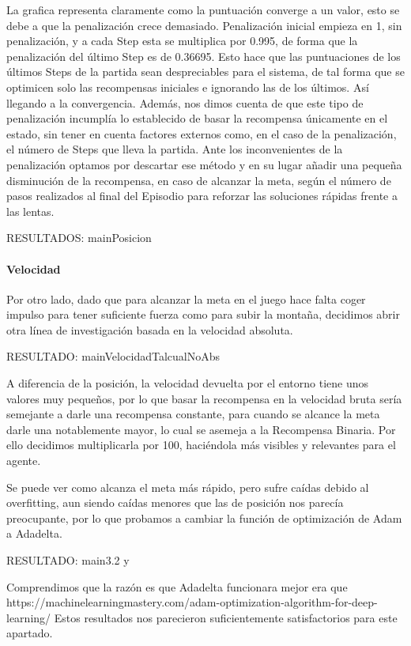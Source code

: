La grafica representa claramente como la puntuación converge a un valor, esto se debe a que la penalización crece demasiado.
Penalización inicial empieza en 1, sin penalización, y a cada Step esta se multiplica por 0.995, de forma que la penalización del último Step es de 0.36695. Esto hace que las puntuaciones de los últimos Steps de la partida sean despreciables para el sistema, de tal forma que se optimicen solo las recompensas iniciales e ignorando las de los últimos. Así llegando a la convergencia. 
Además, nos dimos cuenta de que este tipo de penalización incumplía lo establecido de basar la recompensa únicamente en el estado, sin tener en cuenta factores externos como, en el caso de la penalización, el número de Steps que lleva la partida.
Ante los inconvenientes de la penalización optamos por descartar ese método y en su lugar añadir una pequeña disminución de la recompensa, en caso de alcanzar la meta, según el número de pasos realizados al final del Episodio para reforzar las soluciones rápidas frente a las lentas.

RESULTADOS: mainPosicion

\paragraph{Velocidad}
Por otro lado, dado que para alcanzar la meta en el juego hace falta coger impulso para tener suficiente fuerza como para subir la montaña, decidimos abrir otra línea de investigación basada en la velocidad absoluta.

RESULTADO: mainVelocidadTalcualNoAbs

A diferencia de la posición, la velocidad devuelta por el entorno tiene unos valores muy pequeños, por lo que basar la recompensa en la velocidad bruta sería semejante a darle una recompensa constante, para cuando se alcance la meta darle una notablemente mayor, lo cual se asemeja a la Recompensa Binaria. Por ello decidimos multiplicarla por 100, haciéndola más visibles y relevantes para el agente. 

Se puede ver como alcanza el meta más rápido, pero sufre caídas debido al overfitting, aun siendo caídas menores que las de posición nos parecía preocupante, por lo que probamos a cambiar la función de optimización de Adam a Adadelta.

RESULTADO: main3.2 y  

Comprendimos que la razón es que Adadelta funcionara mejor era que 
https://machinelearningmastery.com/adam-optimization-algorithm-for-deep-learning/
Estos resultados nos parecieron suficientemente satisfactorios para este apartado.

